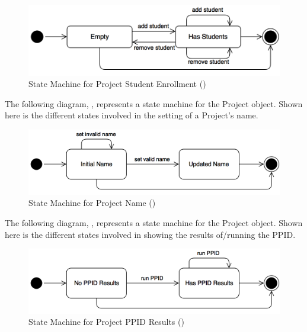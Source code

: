 \documentclass[12pt,letterpaper]{article}
\begin{document}
\begin{figure}[H]
	\centering{}
	\includegraphics[scale=0.3]{imgs/state/project-enrollment.png}
	\caption[ - State Machine for Project Student Enrollment]{State Machine for Project Student Enrollment ()}
\end{figure}

\noindent The following diagram, , represents a state machine for the Project object. Shown here is the different states involved in the setting of a Project's name.

\begin{figure}[H]
	\centering{}
	\includegraphics[scale=0.3]{imgs/state/project-name.png}
	\caption[ - State Machine for Project Name]{State Machine for Project Name ()}
\end{figure}

\noindent The following diagram, , represents a state machine for the Project object. Shown here is the different states involved in showing the results of/running the PPID.

\begin{figure}[H]
	\centering{}
	\includegraphics[scale=0.3]{imgs/state/project-ppid-results.png}
	\caption[ - State Machine for Project PPID Results]{State Machine for Project PPID Results ()}
\end{figure}
\end{document}
